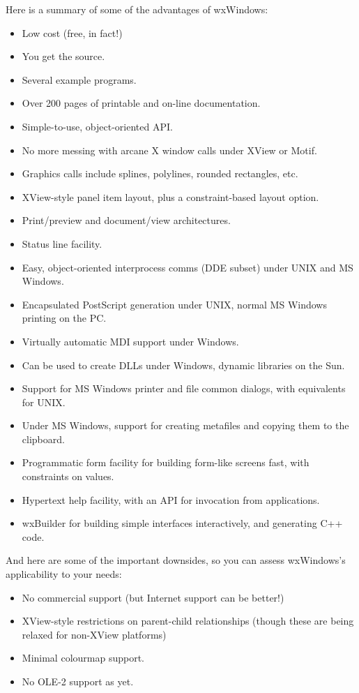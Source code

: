 Here is a summary of some of the advantages of wxWindows:

\begin{itemize}\itemsep=0pt
\item Low cost (free, in fact!)
\item You get the source.
\item Several example programs.
\item Over 200 pages of printable and on-line documentation.
\item Simple-to-use, object-oriented API.
\item No more messing with arcane X window calls under XView or Motif.
\item Graphics calls include splines, polylines, rounded rectangles, etc.
\item XView-style panel item layout, plus a constraint-based layout option.
\item Print/preview and document/view architectures.
\item Status line facility.
\item Easy, object-oriented interprocess comms (DDE subset) under UNIX and
MS Windows.
\item Encapsulated PostScript generation under UNIX, normal MS Windows printing on the
PC.
\item Virtually automatic MDI support under Windows.
\item Can be used to create DLLs under Windows, dynamic libraries on the Sun.
\item Support for MS Windows printer and file common dialogs, with
equivalents for UNIX.
\item Under MS Windows, support for creating metafiles and copying
them to the clipboard.
\item Programmatic form facility for building form-like screens fast,
with constraints on values.
\item Hypertext help facility, with an API for invocation from applications.
\item wxBuilder for building simple interfaces interactively, and generating
C++ code.
\end{itemize}

And here are some of the important downsides, so you can assess wxWindows's
applicability to your needs:

\begin{itemize}\itemsep=0pt
\item No commercial support (but Internet support can be better!)
\item XView-style restrictions on parent-child relationships (though these
are being relaxed for non-XView platforms)
\item Minimal colourmap support.
\item No OLE-2 support as yet.
\end{itemize}

